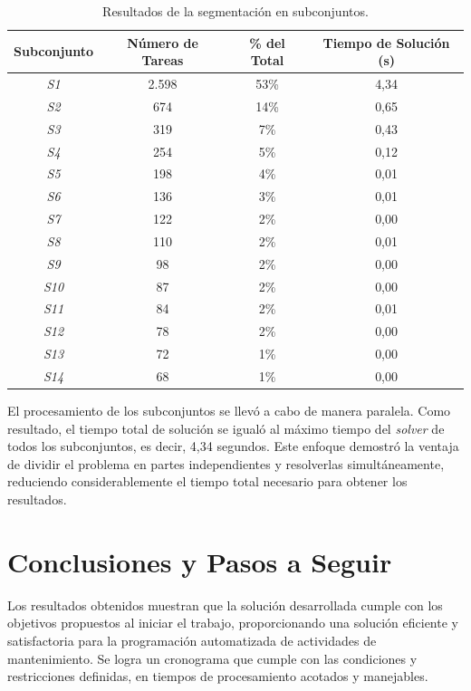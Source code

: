 \documentclass{article}
\begin{document}
\begin{table}[htbp]
    \centering
    \begin{tabular}{cccc}
        \toprule
        \textbf{Subconjunto} & \textbf{Número de Tareas} & \textbf{\% del Total} & \textbf{Tiempo de Solución (s)} \\
        \midrule
        \textit{S1} & 2.598 & 53\% & 4,34 \\
        \textit{S2} & 674 & 14\% & 0,65 \\
        \textit{S3} & 319 & 7\% & 0,43 \\
        \textit{S4} & 254 & 5\% & 0,12 \\
        \textit{S5} & 198 & 4\% & 0,01 \\
        \textit{S6} & 136 & 3\% & 0,01 \\
        \textit{S7} & 122 & 2\% & 0,00 \\
        \textit{S8} & 110 & 2\% & 0,01 \\
        \textit{S9} & 98 & 2\% & 0,00 \\
        \textit{S10} & 87 & 2\% & 0,00 \\
        \textit{S11} & 84 & 2\% & 0,01 \\
        \textit{S12} & 78 & 2\% & 0,00 \\
        \textit{S13} & 72 & 1\% & 0,00 \\
        \textit{S14} & 68 & 1\% & 0,00 \\
        \bottomrule
    \end{tabular}
    \caption{Resultados de la segmentación en subconjuntos.}
    \label{tab:subsets_results}
\end{table}

El procesamiento de los subconjuntos se llevó a cabo de manera paralela. Como resultado, el tiempo total de solución se igualó al máximo tiempo del \textit{solver} de todos los subconjuntos, es decir, 4,34 segundos. Este enfoque demostró la ventaja de dividir el problema en partes independientes y resolverlas simultáneamente, reduciendo considerablemente el tiempo total necesario para obtener los resultados.

\section{Conclusiones y Pasos a Seguir}


Los resultados obtenidos muestran que la solución desarrollada cumple con los objetivos propuestos al iniciar el trabajo, proporcionando una solución eficiente y satisfactoria para la programación automatizada de actividades de mantenimiento. Se logra un cronograma que cumple con las condiciones y restricciones definidas, en tiempos de procesamiento acotados y manejables.
\end{document}
